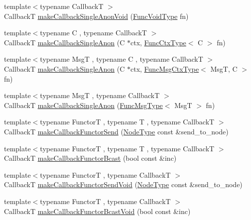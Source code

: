 \begin{DoxyCompactItemize}
\item 
{\footnotesize template$<$typename CallbackT $>$ }\\CallbackT \hyperlink{structvt_1_1pipe_1_1_pipe_manager_t_l_a63c4743a384180c7276afc95302364e6}{make\+Callback\+Single\+Anon\+Void} (\hyperlink{structvt_1_1pipe_1_1_pipe_manager_base_acd6f0c71f38f08d53f85e83b65406d77}{Func\+Void\+Type} fn)
\item 
{\footnotesize template$<$typename C , typename CallbackT $>$ }\\CallbackT \hyperlink{structvt_1_1pipe_1_1_pipe_manager_t_l_ae75afb01250ca2dcb98edc05b4aca57d}{make\+Callback\+Single\+Anon} (C $\ast$ctx, \hyperlink{structvt_1_1pipe_1_1_pipe_manager_base_ad8463823b6b4cfdb67c119d6d22e3bac}{Func\+Ctx\+Type}$<$ C $>$ fn)
\item 
{\footnotesize template$<$typename MsgT , typename C , typename CallbackT $>$ }\\CallbackT \hyperlink{structvt_1_1pipe_1_1_pipe_manager_t_l_a5f29e3456069847eddd1b64bcecca2f2}{make\+Callback\+Single\+Anon} (C $\ast$ctx, \hyperlink{structvt_1_1pipe_1_1_pipe_manager_base_a73fdf82ece0411b3dc644c99b763f7a9}{Func\+Msg\+Ctx\+Type}$<$ MsgT, C $>$ fn)
\item 
{\footnotesize template$<$typename MsgT , typename CallbackT $>$ }\\CallbackT \hyperlink{structvt_1_1pipe_1_1_pipe_manager_t_l_a49d1f142e82be5584fa5b9e5ccf85272}{make\+Callback\+Single\+Anon} (\hyperlink{structvt_1_1pipe_1_1_pipe_manager_base_aa54eee64ab32a27777a672d49eb861f4}{Func\+Msg\+Type}$<$ MsgT $>$ fn)
\item 
{\footnotesize template$<$typename FunctorT , typename T , typename CallbackT $>$ }\\CallbackT \hyperlink{structvt_1_1pipe_1_1_pipe_manager_t_l_a2e9eb336fb5e2f6927b64068411ff2c8}{make\+Callback\+Functor\+Send} (\hyperlink{namespacevt_a866da9d0efc19c0a1ce79e9e492f47e2}{Node\+Type} const \&send\+\_\+to\+\_\+node)
\item 
{\footnotesize template$<$typename FunctorT , typename T , typename CallbackT $>$ }\\CallbackT \hyperlink{structvt_1_1pipe_1_1_pipe_manager_t_l_abb18372fac34782285cdb5d84f4ab449}{make\+Callback\+Functor\+Bcast} (bool const \&inc)
\item 
{\footnotesize template$<$typename FunctorT , typename CallbackT $>$ }\\CallbackT \hyperlink{structvt_1_1pipe_1_1_pipe_manager_t_l_a71bfb005f664ca5f0f6935afbcdb17de}{make\+Callback\+Functor\+Send\+Void} (\hyperlink{namespacevt_a866da9d0efc19c0a1ce79e9e492f47e2}{Node\+Type} const \&send\+\_\+to\+\_\+node)
\item 
{\footnotesize template$<$typename FunctorT , typename CallbackT $>$ }\\CallbackT \hyperlink{structvt_1_1pipe_1_1_pipe_manager_t_l_abca9b24d9d37eb7b3ca6bb3c62160889}{make\+Callback\+Functor\+Bcast\+Void} (bool const \&inc)
\end{DoxyCompactItemize}
